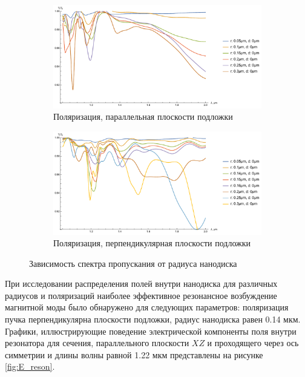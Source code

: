 \begin{figure}[h]
	\begin{subfigure}[b]{\textwidth}
		\centering
		\includegraphics[width=.9\textwidth]{img/total_d0_theta_0}
		\caption{Поляризация, параллельная плоскости подложки}
		\label{fig:1x_fixed_d_theta_0}
	\end{subfigure}

	\begin{subfigure}[b]{\textwidth}
		\centering
		\includegraphics[width=.9\textwidth]{img/total_d0_theta_90}
		\caption{Поляризация, перпендикулярная плоскости подложки}
		\label{fig:1x_fixed_d_theta_90}
	\end{subfigure}
  
  	\caption{Зависимость спектра пропускания от радиуса нанодиска}
  	\label{fig:1x_fixed_d}
\end{figure}

При исследовании распределения полей внутри нанодиска для различных радиусов и поляризаций наиболее эффективное резонансное возбуждение магнитной моды было обнаружено для следующих параметров: поляризация пучка перпендикулярна плоскости подложки, радиус нанодиска равен 0.14 мкм. Графики, иллюстрирующие поведение электрической компоненты поля внутри резонатора для сечения, параллельного плоскости $XZ$ и проходящего через ось симметрии и длины волны равной 1.22 мкм представлены на рисунке \ref{fig:E_reson}.

